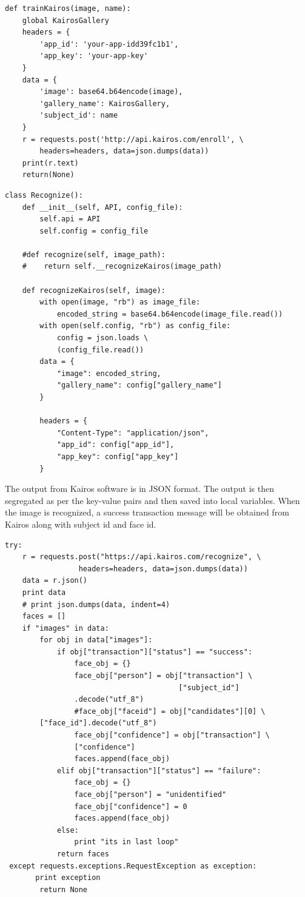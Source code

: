\documentclass[sigconf]{acmart}
\begin{document}
\begin{verbatim}
def trainKairos(image, name):
    global KairosGallery
    headers = {
        'app_id': 'your-app-idd39fc1b1',
        'app_key': 'your-app-key'
    }
    data = {
        'image': base64.b64encode(image),
        'gallery_name': KairosGallery,
        'subject_id': name
    }
    r = requests.post('http://api.kairos.com/enroll', \ 
        headers=headers, data=json.dumps(data))
    print(r.text)
    return(None)
\end{verbatim}

\begin{verbatim}
class Recognize():
    def __init__(self, API, config_file):
        self.api = API
        self.config = config_file

    #def recognize(self, image_path):
    #    return self.__recognizeKairos(image_path)
    
    def recognizeKairos(self, image):
        with open(image, "rb") as image_file:
            encoded_string = base64.b64encode(image_file.read())
        with open(self.config, "rb") as config_file:
            config = json.loads \ 
            (config_file.read())
        data = {
            "image": encoded_string,
            "gallery_name": config["gallery_name"]
        }

        headers = {
            "Content-Type": "application/json",
            "app_id": config["app_id"],
            "app_key": config["app_key"]
        }
\end{verbatim}

The output from Kairos software is in JSON format. The output is then segregated as per the 
key-value pairs and then saved into local variables. When the image is recognized, a success 
transaction message will be obtained from Kairos along with subject id and face id.

\begin{verbatim}
try:
    r = requests.post("https://api.kairos.com/recognize", \ 
                 headers=headers, data=json.dumps(data))
    data = r.json()
    print data
    # print json.dumps(data, indent=4)
    faces = []
    if "images" in data:
        for obj in data["images"]:
            if obj["transaction"]["status"] == "success":
                face_obj = {}
                face_obj["person"] = obj["transaction"] \ 
                                        ["subject_id"]
                .decode("utf_8")
                #face_obj["faceid"] = obj["candidates"][0] \ 
		["face_id"].decode("utf_8")
                face_obj["confidence"] = obj["transaction"] \ 
                ["confidence"]
                faces.append(face_obj)
            elif obj["transaction"]["status"] == "failure":
                face_obj = {}
                face_obj["person"] = "unidentified"
                face_obj["confidence"] = 0
                faces.append(face_obj)
            else:
                print "its in last loop"
            return faces
 except requests.exceptions.RequestException as exception:
       print exception
        return None
\end{verbatim}    
\end{document}
